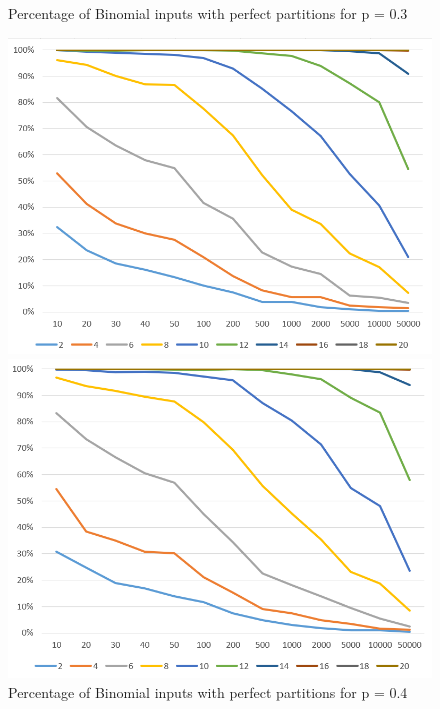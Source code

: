 \begin{figure}[h]
      \centering
      \begin{minipage}[b]{0.45\textwidth}
            \caption{Percentage of Binomial inputs with perfect partitions for p = 0.3}
            \includegraphics[width=\textwidth]{figures/images/solvabilityOfInputs/solvability0_3.png}
      \end{minipage}
      \hspace{0.75cm}
      \begin{minipage}[b]{0.45\textwidth}
            \caption{Percentage of Binomial inputs with perfect partitions for p = 0.4}
            \includegraphics[width=\textwidth]{figures/images/solvabilityOfInputs/solvability0_4.png}
      \end{minipage}
\end{figure}


